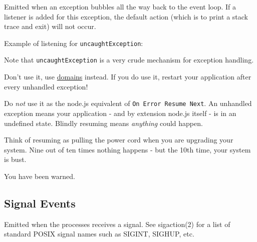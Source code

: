 Emitted when an exception bubbles all the way back to the event loop. If
a listener is added for this exception, the default action (which is to
print a stack trace and exit) will not occur.

Example of listening for \texttt{uncaughtException}:

\begin{Shaded}
\begin{Highlighting}[]
\NormalTok{(}\NormalTok{, }
  \NormalTok{(} 
\NormalTok{\});}

\NormalTok{(}\NormalTok{() \{}
  \NormalTok{(}\NormalTok{);}
\NormalTok{\}, }\NormalTok{);}

\NormalTok{();}
\NormalTok{(}\NormalTok{);}
\end{Highlighting}
\end{Shaded}

Note that \texttt{uncaughtException} is a very crude mechanism for
exception handling.

Don't use it, use \href{domain.html}{domains} instead. If you do use it,
restart your application after every unhandled exception!

Do \emph{not} use it as the node.js equivalent of
\texttt{On Error Resume Next}. An unhandled exception means your
application - and by extension node.js itself - is in an undefined
state. Blindly resuming means \emph{anything} could happen.

Think of resuming as pulling the power cord when you are upgrading your
system. Nine out of ten times nothing happens - but the 10th time, your
system is bust.

You have been warned.

\subsection{Signal Events}\label{signal-events}

Emitted when the processes receives a signal. See sigaction(2) for a
list of standard POSIX signal names such as SIGINT, SIGHUP, etc.

